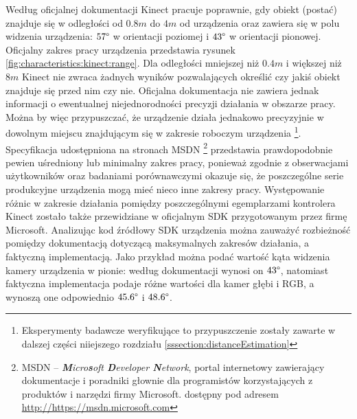 Według oficjalnej dokumentacji \cite{kinectSpec2016} Kinect pracuje poprawnie, gdy obiekt (postać) znajduje się w odległości od $0.8m$ do $4m$ od urządzenia oraz zawiera się w polu widzenia urządzenia: $57\degree$ w orientacji poziomej i $43\degree$ w orientacji pionowej. Oficjalny zakres pracy urządzenia przedstawia rysunek \ref{fig:characteristics:kinect:range}. Dla odległości mniejszej niż $0.4m$ i większej niż $8m$ Kinect nie zwraca żadnych wyników pozwalających określić czy jakiś obiekt znajduje się przed nim czy nie. Oficjalna dokumentacja nie zawiera jednak informacji o ewentualnej niejednorodności precyzji działania w obszarze pracy. Można by więc przypuszczać, że urządzenie działa jednakowo precyzyjnie w dowolnym miejscu znajdującym się w zakresie roboczym urządzenia \footnote{Eksperymenty badawcze weryfikujące to przypuszczenie zostały zawarte w dalszej części niiejszego rozdziału \ref{sssection:distanceEstimation}}. 
Specyfikacja udostępniona na stronach MSDN \footnote{MSDN -- \emph{\textbf{M}icro\textbf{s}oft \textbf{D}eveloper \textbf{N}etwork}, portal internetowy zawierający dokumentacje i poradniki głownie dla programistów korzystających z produktów i narzędzi firmy Microsoft. dostępny pod adresem \url{http://https://msdn.microsoft.com}}
przedstawia prawdopodobnie pewien uśredniony lub minimalny zakres pracy, ponieważ zgodnie z obserwacjami użytkowników \cite{stack:kinect2011} oraz badaniami porównawczymi \cite{DiFilippo2015} okazuje się, że poszczególne serie produkcyjne urządzenia mogą mieć nieco inne zakresy pracy. Występowanie różnic w zakresie działania pomiędzy poszczególnymi egemplarzami kontrolera Kinect zostało także przewidziane w oficjalnym SDK przygotowanym przez firmę Microsoft\cite{msdn:kinectSDKConstants2016}. Analizując kod źródłowy SDK urządzenia można zauważyć rozbieżność pomiędzy dokumentacją dotyczącą maksymalnych zakresów działania, a faktyczną implementacją. Jako przykład można podać wartość kąta widzenia kamery urządzenia w pionie: według dokumentacji wynosi on $43\degree$, natomiast faktyczna implementacja podaje różne wartości dla kamer głębi i RGB, a wynoszą one odpowiednio $45.6\degree$ i $48.6\degree$. 
		

		
